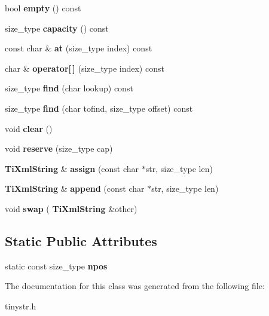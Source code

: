 \begin{DoxyCompactItemize}
bool {\bfseries empty} () const
\item 
\mbox{\label{classTiXmlString_a0ca248f026e698f79b8aa4c9ab8e1571}} 
size\+\_\+type {\bfseries capacity} () const
\item 
\mbox{\label{classTiXmlString_a7f33c37f7dfde5193f02521d2a7af1db}} 
const char \& {\bfseries at} (size\+\_\+type index) const
\item 
\mbox{\label{classTiXmlString_a06e8c84831fc146610369405f4aa4200}} 
char \& {\bfseries operator[$\,$]} (size\+\_\+type index) const
\item 
\mbox{\label{classTiXmlString_a22fc54a23c5a0ab771331a25a769516e}} 
size\+\_\+type {\bfseries find} (char lookup) const
\item 
\mbox{\label{classTiXmlString_a2d66cfd6986faceda62ca62db553a921}} 
size\+\_\+type {\bfseries find} (char tofind, size\+\_\+type offset) const
\item 
\mbox{\label{classTiXmlString_ab20e06e4c666abf3bdbfb3a1191d4888}} 
void {\bfseries clear} ()
\item 
\mbox{\label{classTiXmlString_a88ecf9f0f00cb5c67b6b637958d7049c}} 
void {\bfseries reserve} (size\+\_\+type cap)
\item 
\mbox{\label{classTiXmlString_afe4cd3452ccd7cd8c8cac16e24ea28d7}} 
\textbf{ Ti\+Xml\+String} \& {\bfseries assign} (const char $\ast$str, size\+\_\+type len)
\item 
\mbox{\label{classTiXmlString_a717b00190c8acdee94816d2f4f20e75a}} 
\textbf{ Ti\+Xml\+String} \& {\bfseries append} (const char $\ast$str, size\+\_\+type len)
\item 
\mbox{\label{classTiXmlString_aa392cbc180752a79f007f4f9280c7762}} 
void {\bfseries swap} (\textbf{ Ti\+Xml\+String} \&other)
\end{DoxyCompactItemize}
\subsection*{Static Public Attributes}
\begin{DoxyCompactItemize}
\item 
\mbox{\label{classTiXmlString_a1aa6260982d3a63f0c822fe40fd7b37f}} 
static const size\+\_\+type {\bfseries npos}
\end{DoxyCompactItemize}


The documentation for this class was generated from the following file\+:\begin{DoxyCompactItemize}
\item 
tinystr.\+h\end{DoxyCompactItemize}
